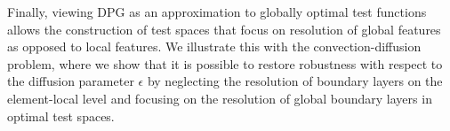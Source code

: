 \documentclass[11pt,onecolumn]{scrartcl}
\begin{document}
Finally, viewing DPG as an approximation to globally optimal test functions allows the construction of test spaces that focus on resolution of global features as opposed to local features.  We illustrate this with the convection-diffusion problem, where we show that it is possible to restore robustness with respect to the diffusion parameter $\epsilon$ by neglecting the resolution of boundary layers on the element-local level and focusing on the resolution of global boundary layers in optimal test spaces.  

%



\end{document}

